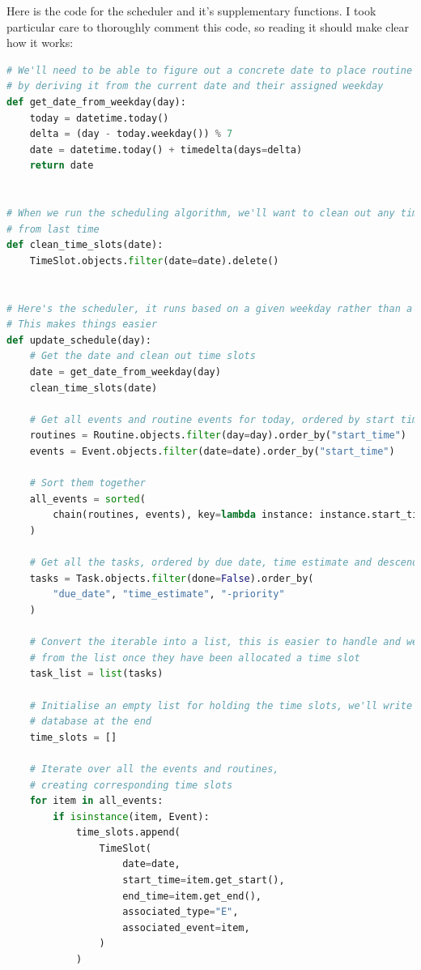 \documentclass{article}
\begin{document}
Here is the code for the scheduler and it's supplementary functions.
I took particular care to thoroughly comment this code,
so reading it should make clear how it works:
\begin{lstlisting}[language=Python]
# We'll need to be able to figure out a concrete date to place routine events on
# by deriving it from the current date and their assigned weekday
def get_date_from_weekday(day):
    today = datetime.today()
    delta = (day - today.weekday()) % 7
    date = datetime.today() + timedelta(days=delta)
    return date


# When we run the scheduling algorithm, we'll want to clean out any time slots
# from last time
def clean_time_slots(date):
    TimeSlot.objects.filter(date=date).delete()


# Here's the scheduler, it runs based on a given weekday rather than a date.
# This makes things easier
def update_schedule(day):
    # Get the date and clean out time slots
    date = get_date_from_weekday(day)
    clean_time_slots(date)

    # Get all events and routine events for today, ordered by start time
    routines = Routine.objects.filter(day=day).order_by("start_time")
    events = Event.objects.filter(date=date).order_by("start_time")

    # Sort them together
    all_events = sorted(
        chain(routines, events), key=lambda instance: instance.start_time
    )

    # Get all the tasks, ordered by due date, time estimate and descending priority level
    tasks = Task.objects.filter(done=False).order_by(
        "due_date", "time_estimate", "-priority"
    )

    # Convert the iterable into a list, this is easier to handle and we can remove tasks
    # from the list once they have been allocated a time slot
    task_list = list(tasks)

    # Initialise an empty list for holding the time slots, we'll write them all to the
    # database at the end
    time_slots = []

    # Iterate over all the events and routines,
    # creating corresponding time slots
    for item in all_events:
        if isinstance(item, Event):
            time_slots.append(
                TimeSlot(
                    date=date,
                    start_time=item.get_start(),
                    end_time=item.get_end(),
                    associated_type="E",
                    associated_event=item,
                )
            )


\end{lstlisting}
\end{document}
